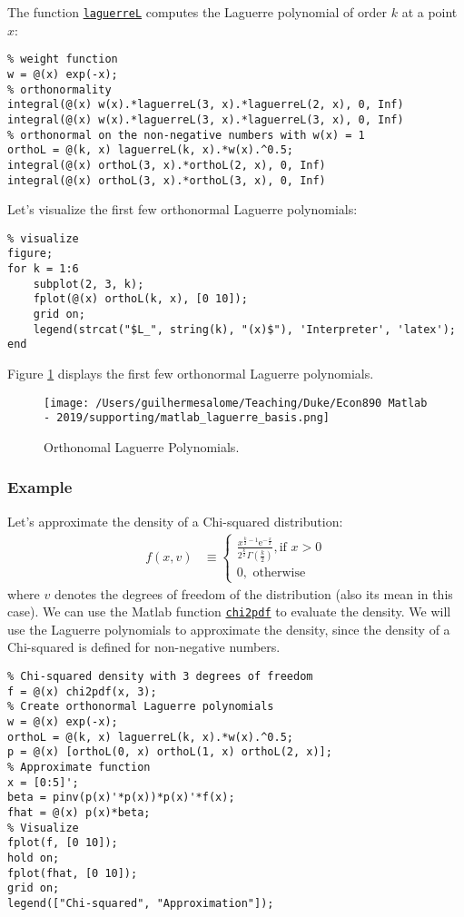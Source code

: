 \documentclass[12pt, a4paper]{article}
\newcommand{\e}[1]{\text{e}^{#1}}
\begin{document}
The function \href{https://www.mathworks.com/help/symbolic/laguerrel.html}{\texttt{laguerreL}} computes the Laguerre polynomial of order \(k\) at a point \(x\):
\lstset{language=matlab,label= ,caption= ,captionpos=b,firstnumber=1,numbers=left,style=Matlab-editor}
\begin{lstlisting}
% weight function
w = @(x) exp(-x);
% orthonormality
integral(@(x) w(x).*laguerreL(3, x).*laguerreL(2, x), 0, Inf)
integral(@(x) w(x).*laguerreL(3, x).*laguerreL(3, x), 0, Inf)
% orthonormal on the non-negative numbers with w(x) = 1
orthoL = @(k, x) laguerreL(k, x).*w(x).^0.5;
integral(@(x) orthoL(3, x).*orthoL(2, x), 0, Inf)
integral(@(x) orthoL(3, x).*orthoL(3, x), 0, Inf)
\end{lstlisting}

Let's visualize the first few orthonormal Laguerre polynomials:
\lstset{language=matlab,label= ,caption= ,captionpos=b,firstnumber=1,numbers=left,style=Matlab-editor}
\begin{lstlisting}
% visualize
figure;
for k = 1:6
    subplot(2, 3, k);
    fplot(@(x) orthoL(k, x), [0 10]);
    grid on;
    legend(strcat("$L_", string(k), "(x)$"), 'Interpreter', 'latex');
end
\end{lstlisting}
Figure \ref{fig:orgb8c55ad} displays the first few orthonormal Laguerre polynomials.
\begin{figure}[H]
\centering
\texttt{[image: /Users/guilhermesalome/Teaching/Duke/Econ890 Matlab - 2019/supporting/matlab\_laguerre\_basis.png]}
\caption{\label{fig:orgb8c55ad}
Orthonomal Laguerre Polynomials.}
\end{figure}
\subsubsection{Example}
\label{sec:org0547eb8}
Let's approximate the density of a Chi-squared distribution:
\begin{align*}
  f(x, v) &\equiv \begin{cases}
    \frac{x^{\frac{k}{2}-1}\e{-\frac{x}{2}}}{2^{\frac{k}{2}}\Gamma\left(\frac{k}{2}\right)},\text{
      if } x > 0\\
    0,\text{ otherwise}
  \end{cases}
\end{align*}
where \(v\) denotes the degrees of freedom of the distribution (also its mean in this case).
We can use the Matlab function \href{https://www.mathworks.com/help/stats/chi2pdf.html?s\_tid=doc\_ta}{\texttt{chi2pdf}} to evaluate the density.
We will use the Laguerre polynomials to approximate the density, since the density of a Chi-squared is defined for non-negative numbers.
\lstset{language=matlab,label= ,caption= ,captionpos=b,firstnumber=1,numbers=left,style=Matlab-editor}
\begin{lstlisting}
% Chi-squared density with 3 degrees of freedom
f = @(x) chi2pdf(x, 3);
% Create orthonormal Laguerre polynomials
w = @(x) exp(-x);
orthoL = @(k, x) laguerreL(k, x).*w(x).^0.5;
p = @(x) [orthoL(0, x) orthoL(1, x) orthoL(2, x)];
% Approximate function
x = [0:5]';
beta = pinv(p(x)'*p(x))*p(x)'*f(x);
fhat = @(x) p(x)*beta;
% Visualize
fplot(f, [0 10]);
hold on;
fplot(fhat, [0 10]);
grid on;
legend(["Chi-squared", "Approximation"]);
\end{lstlisting}
\end{document}
